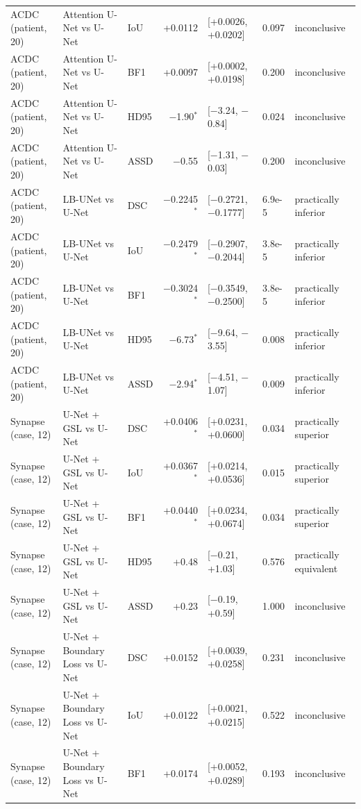 \begin{tabular}{lllrlll}
ACDC (patient, 20) & Attention U-Net vs U-Net & IoU & +0.0112 & [+0.0026, +0.0202] & 0.097 & inconclusive \\
ACDC (patient, 20) & Attention U-Net vs U-Net & BF1 & +0.0097 & [+0.0002, +0.0198] & 0.200 & inconclusive \\
ACDC (patient, 20) & Attention U-Net vs U-Net & HD95 & $-$1.90$^{*}$ & [$-$3.24, $-$0.84] & 0.024 & inconclusive \\
ACDC (patient, 20) & Attention U-Net vs U-Net & ASSD & $-$0.55 & [$-$1.31, $-$0.03] & 0.200 & inconclusive \\
ACDC (patient, 20) & LB-UNet vs U-Net & DSC & $-$0.2245$^{*}$ & [$-$0.2721, $-$0.1777] & 6.9e-5 & practically inferior \\
ACDC (patient, 20) & LB-UNet vs U-Net & IoU & $-$0.2479$^{*}$ & [$-$0.2907, $-$0.2044] & 3.8e-5 & practically inferior \\
ACDC (patient, 20) & LB-UNet vs U-Net & BF1 & $-$0.3024$^{*}$ & [$-$0.3549, $-$0.2500] & 3.8e-5 & practically inferior \\
ACDC (patient, 20) & LB-UNet vs U-Net & HD95 & $-$6.73$^{*}$ & [$-$9.64, $-$3.55] & 0.008 & practically inferior \\
ACDC (patient, 20) & LB-UNet vs U-Net & ASSD & $-$2.94$^{*}$ & [$-$4.51, $-$1.07] & 0.009 & practically inferior \\
\midrule
Synapse (case, 12) & U-Net + GSL vs U-Net & DSC & +0.0406$^{*}$ & [+0.0231, +0.0600] & 0.034 & practically superior \\
Synapse (case, 12) & U-Net + GSL vs U-Net & IoU & +0.0367$^{*}$ & [+0.0214, +0.0536] & 0.015 & practically superior \\
Synapse (case, 12) & U-Net + GSL vs U-Net & BF1 & +0.0440$^{*}$ & [+0.0234, +0.0674] & 0.034 & practically superior \\
Synapse (case, 12) & U-Net + GSL vs U-Net & HD95 & +0.48 & [$-$0.21, +1.03] & 0.576 & practically equivalent \\
Synapse (case, 12) & U-Net + GSL vs U-Net & ASSD & +0.23 & [$-$0.19, +0.59] & 1.000 & inconclusive \\
Synapse (case, 12) & U-Net + Boundary Loss vs U-Net & DSC & +0.0152 & [+0.0039, +0.0258] & 0.231 & inconclusive \\
Synapse (case, 12) & U-Net + Boundary Loss vs U-Net & IoU & +0.0122 & [+0.0021, +0.0215] & 0.522 & inconclusive \\
Synapse (case, 12) & U-Net + Boundary Loss vs U-Net & BF1 & +0.0174 & [+0.0052, +0.0289] & 0.193 & inconclusive \\

\end{tabular}
